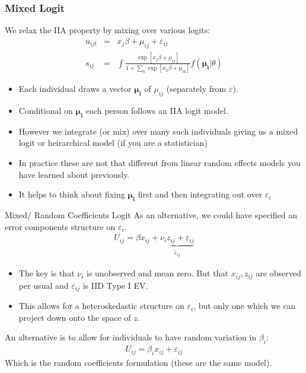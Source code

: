 \documentclass[xcolor=pdftex,dvipsnames,table,mathserif,aspectratio=169]{beamer}
\begin{document}
\begin{frame}
\frametitle{Mixed Logit}
We relax the IIA property by mixing over various logits:
\begin{eqnarray*}
u_{ijt} &=& x_j \beta + \mu_{ij} + \varepsilon_{ij} \\
s_{ij} &=& \int \frac{\exp[x_{j} \beta + \mu_{ij} ]}{1+\sum_k \exp[x_{k} \beta + \mu_{ik} ]} f(\boldsymbol{\mu_i} | \theta)
\end{eqnarray*}
 \begin{itemize}
 \item Each individual draws a vector $\boldsymbol{\mu_i}$ of $\mu_{ij}$ (separately from $\varepsilon$).
 \item Conditional on $\boldsymbol{\mu_i}$ each person follows an IIA logit model.
 \item However we integrate (or mix) over many such individuals giving us a \alert{mixed logit} or \alert{heirarchical model} (if you are a statistician)
 \item In practice these are not that different from linear \alert{random effects models} you have learned about previously.
 \item It helps to think about fixing $\boldsymbol{\mu_i}$ first and then integrating out over $\varepsilon_i$
 \end{itemize}
\end{frame}

\begin{frame}{Mixed/ Random Coefficients Logit}
\small
As an alternative, we could have specified an error components structure on $\varepsilon_i$.
\begin{eqnarray*}
U_{ij} = \beta x_{ij} + \underbrace{\nu_i z_{ij} + \varepsilon_{ij}}_{\tilde{\varepsilon}_{ij}}
\end{eqnarray*}
\begin{itemize}
\item The key is that $\nu_i$ is unobserved and mean zero. But that $x_{ij},z_{ij}$ are observed per usual and $\varepsilon_{ij}$ is IID Type I EV.
\item This allows for a heteroskedastic structure on $\varepsilon_{i}$, but only one which we can project down onto the space of $z$.
\end{itemize}
An alternative is to allow for individuals to have random variation in $\beta_i$:
\begin{eqnarray*}
U_{ij} = \beta_i x_{ij} +  \varepsilon_{ij}
\end{eqnarray*}
Which is the random coefficients formulation (these are the same model).
\end{frame}
\end{document}
